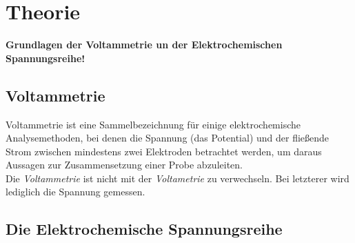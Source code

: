 \section{Theorie}
\label{sec:theorie}
\textbf{Grundlagen der Voltammetrie un der Elektrochemischen Spannungsreihe!}\\
\subsection{Voltammetrie}
Voltammetrie ist eine Sammelbezeichnung für einige elektrochemische Analysemethoden, bei denen die Spannung (das Potential) und der fließende Strom zwischen mindestens zwei Elektroden betrachtet werden, um daraus Aussagen zur Zusammensetzung einer Probe abzuleiten.\\
Die \textit{Voltammetrie} ist nicht mit der \textit{Voltametrie} zu verwechseln. Bei letzterer wird lediglich die Spannung gemessen.
\subsection{Die Elektrochemische Spannungsreihe}




